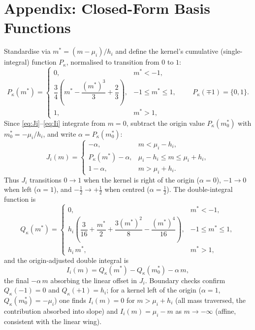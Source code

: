 \documentclass[11pt]{book}
\theoremstyle{plain}
\theoremstyle{definition}
\theoremstyle{remark}
\newcommand{\mln}{m}                             %
\begin{document}
\section{Appendix: Closed-Form Basis Functions}
\label{sec:closed}

Standardise via $\mln^* = (\mln - \mu_i)/h_i$ and define the kernel's cumulative
(single-integral) function $P_\kappa$, normalised to transition from $0$ to $1$:
\begin{equation}\label{eq:Pkappa}
P_\kappa(\mln^*) = \begin{cases}
0, & \mln^* < -1,\\[2pt]
\dfrac34\!\left(\mln^* - \dfrac{(\mln^*)^3}{3} + \dfrac23\right),
& -1\le\mln^*\le 1,\\[8pt]
1, & \mln^* > 1,
\end{cases}
\qquad P_\kappa(\mp 1) = \{0,1\}.
\end{equation}
Since \eqref{eq:Ji}--\eqref{eq:Ii} integrate from $\mln = 0$, subtract the
origin value $P_\kappa(\mln^*_0)$ with $\mln^*_0 = -\mu_i/h_i$, and write
$\alpha = P_\kappa(\mln^*_0)$:
\begin{equation}\label{eq:Ji-closed}
J_i(\mln) = \begin{cases}
-\alpha, & \mln < \mu_i - h_i,\\[2pt]
P_\kappa(\mln^*) - \alpha, & \mu_i - h_i \le \mln \le \mu_i + h_i,\\[2pt]
1 - \alpha, & \mln > \mu_i + h_i.
\end{cases}
\end{equation}
Thus $J_i$ transitions $0\to 1$ when the kernel is right of the origin
($\alpha=0$), $-1\to 0$ when left ($\alpha=1$), and $-\tfrac12\to+\tfrac12$ when
centred ($\alpha=\tfrac12$). The double-integral function is
\[
Q_\kappa(\mln^*) = \begin{cases}
0, & \mln^* < -1,\\[2pt]
h_i\!\left(\dfrac{3}{16} + \dfrac{\mln^*}{2} + \dfrac{3(\mln^*)^2}{8}
- \dfrac{(\mln^*)^4}{16}\right), & -1\le\mln^*\le 1,\\[8pt]
h_i\,\mln^*, & \mln^* > 1,
\end{cases}
\]
and the origin-adjusted double integral is
\begin{equation}\label{eq:Ii-closed}
I_i(\mln) = Q_\kappa(\mln^*) - Q_\kappa(\mln^*_0) - \alpha\,\mln,
\end{equation}
the final $-\alpha\,\mln$ absorbing the linear offset in $J_i$. Boundary checks
confirm $Q_\kappa(-1) = 0$ and $Q_\kappa(+1) = h_i$; for a kernel left of the
origin ($\alpha = 1$, $Q_\kappa(\mln^*_0) = -\mu_i$) one finds $I_i(\mln) = 0$
for $\mln > \mu_i + h_i$ (all mass traversed, the contribution absorbed into
slope) and $I_i(\mln) = \mu_i - \mln$ as $\mln\to-\infty$ (affine, consistent
with the linear wing).
\end{document}
